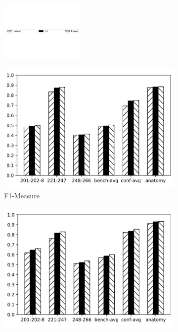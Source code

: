 \documentclass[twoside]{article}
\begin{document}
\begin{figure}[htb!]\centering
\begin{subfigure}{\textwidth}
	\centering
\includegraphics[width=0.45\textwidth]{figures/t_legend.pdf}
\end{subfigure}
\begin{subfigure}{0.3\textwidth}
	\centering
\includegraphics[width=\textwidth]{data_figs/MulRegress_LogMap_F1.pdf}
\caption{F1-Measure}
\label{fig:MultiRegress_LogMap_F1}
\end{subfigure}
\begin{subfigure}{0.3\textwidth}
	\centering
\includegraphics[width=\textwidth]{data_figs/MulRegress_LogMap_P.pdf}

\end{subfigure}
\end{figure}
\end{document}

